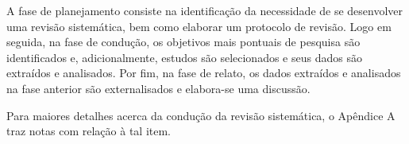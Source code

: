 A fase de planejamento consiste na identificação da necessidade de se desenvolver uma revisão sistemática, bem como elaborar um protocolo de revisão. Logo em seguida, na fase de condução, os objetivos mais pontuais de pesquisa são identificados e, adicionalmente, estudos são selecionados e seus dados são extraídos e analisados. Por fim, na fase de relato, os dados extraídos e analisados na fase anterior são externalisados e elabora-se uma discussão.

Para maiores detalhes acerca da condução da revisão sistemática, o Apêndice A traz notas com relação à tal item.